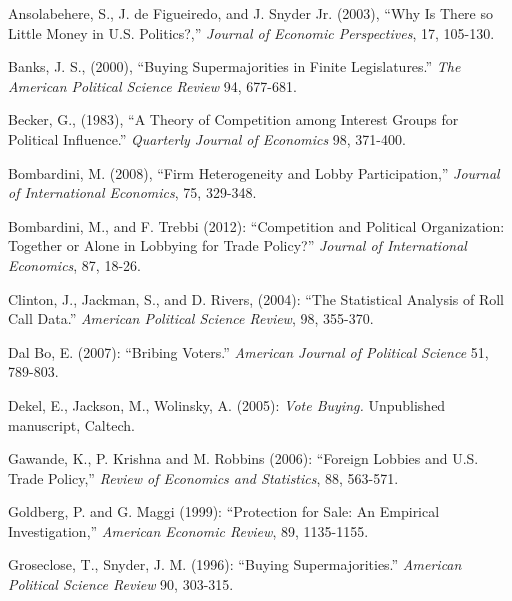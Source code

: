 \documentclass[12pt]{article}
\begin{document}
\begin{list}{}{\setlength{\leftmargin}{0.3in}\setlength{\rightmargin}{0.0in}\setlength{\itemindent}{-0.3in}\setlength{\itemsep}{0.0in}}


\item Ansolabehere, S., J. de Figueiredo, and J. Snyder Jr. (2003), ``Why Is There so Little Money in U.S. Politics?,'' {\em Journal of Economic Perspectives}, 17, 105-130.

\item Banks, J. S., (2000), ``Buying Supermajorities in Finite Legislatures.'' {\em The American Political Science Review} 94, 677-681.

\item Becker, G., (1983), ``A Theory of Competition among Interest Groups for Political Influence.'' {\em Quarterly Journal of Economics} 98, 371-400.

\item Bombardini, M. (2008), ``Firm Heterogeneity and Lobby Participation,'' {\em Journal of International Economics}, 75, 329-348.

\item Bombardini, M., and F. Trebbi (2012): ``Competition and Political Organization: Together or Alone in Lobbying for Trade Policy?'' {\em Journal of International Economics}, 87, 18-26.

\item Clinton, J., Jackman, S., and D. Rivers, (2004): ``The Statistical Analysis of Roll Call Data.'' {\em American Political Science Review}, 98, 355-370.

\item Dal Bo, E. (2007): ``Bribing Voters.'' {\em American Journal of Political Science} 51, 789-803.

\item Dekel, E., Jackson, M., Wolinsky, A. (2005): {\em Vote Buying.} Unpublished manuscript, Caltech.

\item Gawande, K., P. Krishna and M. Robbins (2006): ``Foreign Lobbies and U.S. Trade Policy,'' {\em Review of Economics and Statistics}, 88, 563-571.

\item Goldberg, P. and G. Maggi (1999): ``Protection for Sale: An Empirical Investigation,'' {\em American Economic Review}, 89, 1135-1155.

\item Groseclose, T., Snyder, J. M. (1996): ``Buying Supermajorities.'' {\em American Political Science Review} 90, 303-315.


\end{list}
\end{document}
